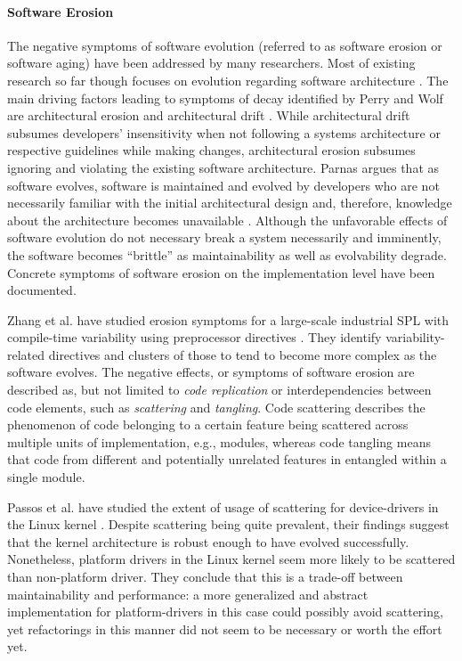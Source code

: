 \documentclass[bibliography=totoc]{tubsreprt}
\begin{document}
\paragraph*{Software Erosion}
The negative symptoms of software evolution (referred to as software erosion or
software aging) have been addressed by many researchers. Most of existing
research so far though focuses on evolution regarding software architecture
\cite{breivold_systematic_2012}. The main driving factors leading to symptoms of decay
identified by Perry and Wolf are architectural erosion and architectural drift
\cite{perry_software_1991}. While architectural drift subsumes developers’ insensitivity when not following
a systems architecture or respective guidelines while making changes,
architectural erosion subsumes ignoring and violating the existing software
architecture. Parnas argues that as software evolves, software is maintained
and evolved by developers who are not necessarily familiar with the initial
architectural design and, therefore, knowledge about the architecture becomes
unavailable \cite{parnas_software_1994}. Although the unfavorable effects of software evolution do not necessary break a
system necessarily and imminently, the software becomes ``brittle'' \cite{perry_software_1991}
as maintainability as well as evolvability degrade. Concrete  symptoms of software
erosion on the implementation level have been documented. 

Zhang et al. have studied erosion symptoms for a large-scale industrial SPL
with compile-time variability using preprocessor directives \cite{zhang_variability_2013}. They
identify variability-related directives and clusters of those to tend to become more
complex as the software evolves. The negative effects, or symptoms of software
erosion are described as, but not limited to \emph{code replication} or
interdependencies between code elements, such as \emph{scattering} and
\emph{tangling}. Code scattering describes the phenomenon of code belonging to
a certain feature being scattered across multiple units of implementation,
e.g., modules, whereas code tangling means that code from different and
potentially unrelated features in entangled within a single module.

Passos et al. have studied the extent of usage of scattering for device-drivers
in the Linux kernel \cite{passos_feature_2015}. Despite scattering being quite prevalent, their
findings suggest that the kernel architecture is robust enough to have evolved
successfully. Nonetheless, platform drivers in the Linux kernel seem more
likely to be scattered than non-platform driver. They conclude that this is a
trade-off between maintainability and performance: a more generalized and
abstract implementation for platform-drivers in this case could possibly avoid
scattering, yet refactorings in this manner did not seem to be necessary or
worth the effort yet.
\end{document}
